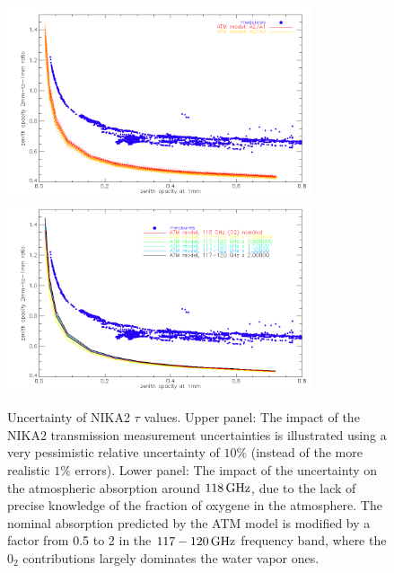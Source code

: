 \begin{figure}[ht]
\begin{center}
  \includegraphics[width=0.8\textwidth]{Figures/opacity_tau1_tau2_ratio_bperror10pc_N2R9_N2R10.png}
  \includegraphics[width=0.8\textwidth]{Figures/opacity_tau1_tau2_ratio_o2fraction_N2R9_N2R10.png}
\caption[Robustness tests on opacity estimates]{Uncertainty of NIKA2 $\tau$ values. Upper panel: The impact
  of the NIKA2 transmission measurement uncertainties is illustrated
  using a very pessimistic relative uncertainty of $10\%$ (instead of
  the more realistic $1\%$ errors). Lower panel: The impact of the
uncertainty on the atmospheric absorption around $118\, \rm{GHz}$, due
to the lack of precise knowledge of the fraction of oxygene in the
atmosphere. The nominal absorption predicted by the ATM model is
modified by a factor from 0.5 to 2 in the $117-120\, \rm{GHz}$
frequency band, where the $0_2$ contributions largely dominates the
water vapor ones. }
  \label{fig:opacity_errors}
\end{center}
\end{figure}

